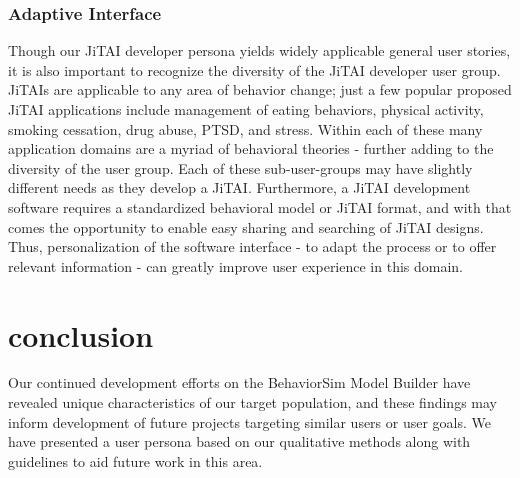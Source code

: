 \documentclass{sigchi}
\begin{document}
\subsubsection{Adaptive Interface}
Though our JiTAI developer persona yields widely applicable general user stories, it is also important to recognize the diversity of the JiTAI developer user group.
JiTAIs are applicable to any area of behavior change; just a few popular proposed JiTAI applications include management of eating behaviors, physical activity, smoking cessation, drug abuse, PTSD, and stress.
Within each of these many application domains are a myriad of behavioral theories - further adding to the diversity of the user group.
Each of these sub-user-groups may have slightly different needs as they develop a JiTAI.
Furthermore, a JiTAI development software requires a standardized behavioral model or JiTAI format, and with that comes the opportunity to enable easy sharing and searching of JiTAI designs.
Thus, personalization of the software interface - to adapt the process or to offer relevant information\cite{kay2012creating} - can greatly improve user experience in this domain.

\section{conclusion}
Our continued development efforts on the BehaviorSim Model Builder have revealed unique characteristics of our target population, and these findings may inform development of future projects targeting similar users or user goals.
We have presented a user persona based on our qualitative methods along with guidelines to aid future work in this area.


%
%
%
%
%
\balance{}



\end{document}
